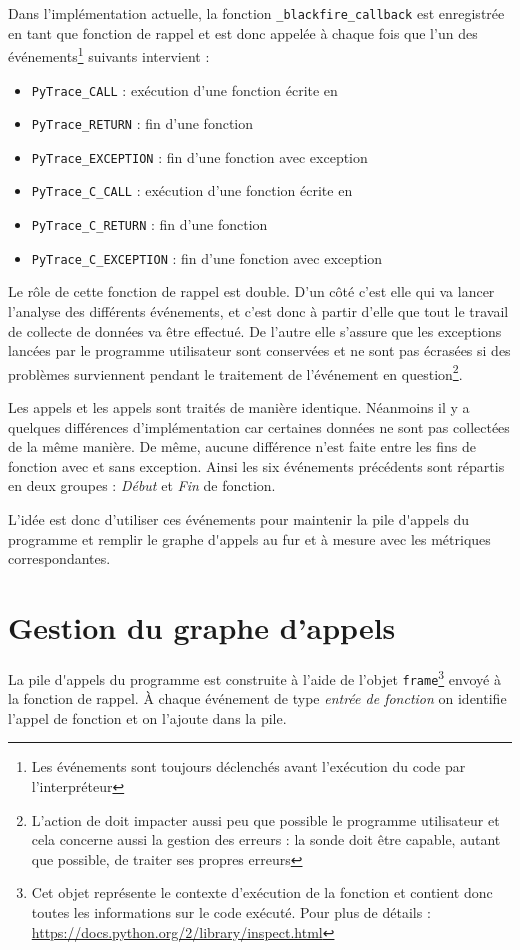 Dans l'implémentation actuelle, la fonction \C \verb|_blackfire_callback| est enregistrée en tant que fonction de rappel et est donc appelée à chaque fois que l'un des événements\footnote{Les événements sont toujours déclenchés avant l'exécution du code par l'interpréteur} suivants intervient :
\begin{itemize}
\item \verb|PyTrace_CALL| : exécution d'une fonction écrite en \Python
\item \verb|PyTrace_RETURN| : fin d'une fonction \Python
\item \verb|PyTrace_EXCEPTION| : fin d'une fonction \Python avec exception
\item \verb|PyTrace_C_CALL| : exécution d'une fonction écrite en \C
\item \verb|PyTrace_C_RETURN| : fin d'une fonction \C
\item \verb|PyTrace_C_EXCEPTION| : fin d'une fonction \C avec exception
\end{itemize}

Le rôle de cette fonction de rappel est double. D'un côté c'est elle qui va lancer l'analyse des différents événements, et c'est donc à partir d'elle que tout le travail de collecte de données va être effectué. De l'autre elle s'assure que les exceptions lancées par le programme utilisateur sont conservées et ne sont pas écrasées si des problèmes surviennent pendant le traitement de l'événement en question\footnote{L'action de \Blackfire doit impacter aussi peu que possible le programme utilisateur et cela concerne aussi la gestion des erreurs : la sonde doit être capable, autant que possible, de traiter ses propres erreurs}.

Les appels \C et les appels \Python sont traités de manière identique. Néanmoins il y a quelques différences d'implémentation car certaines données ne sont pas collectées de la même manière. De même, aucune différence n'est faite entre les fins de fonction avec et sans exception. Ainsi les six événements précédents sont répartis en deux groupes : \emph{Début} et \emph{Fin} de fonction.

L'idée est donc d'utiliser ces événements pour maintenir la \gls{pile d'appels} du programme et remplir le \gls{graphe d'appels} au fur et à mesure avec les métriques correspondantes.

  \section{Gestion du graphe d'appels}
  \label{sec:gestion-graph-appels}
La \gls{pile d'appels} du programme est construite à l'aide de l'objet \verb|frame|\footnote{Cet objet représente le contexte d'exécution de la fonction et contient donc toutes les informations sur le code exécuté. Pour plus de détails : \url{https://docs.python.org/2/library/inspect.html}} envoyé à la fonction de rappel. À chaque événement de type \emph{entrée de fonction} on identifie l'appel de fonction et on l'ajoute dans la pile.
  
